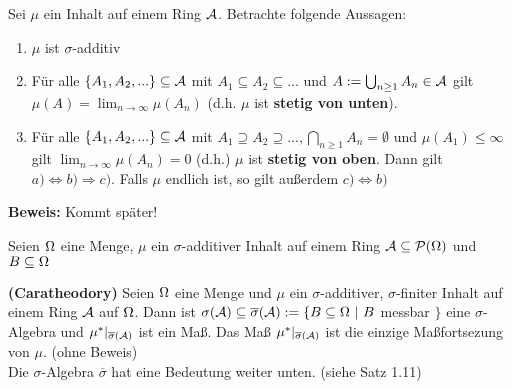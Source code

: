 \documentclass[parskip = full, 12pt]{scrartcl}
\begin{document}
\label{ss: Satz 1.7}
	Sei $\mu$ ein Inhalt auf einem Ring $\mathcal{A}$. Betrachte folgende Aussagen:
	\begin{enumerate}
		\item $\mu$ ist $\sigma$-additiv
		\item Für alle $\{A_1,A_2,...\} \subseteq \mathcal{A}$ mit $A_1 \subseteq A_2 
			\subseteq ...$ und $A := \bigcup_{n \geq 1} A_n \in \mathcal{A}$ gilt 
			$\mu(A) =\lim_{n \rightarrow \infty} \mu(A_n)$ (d.h. $\mu$ 
			ist \textbf{stetig von unten}). 
		\item Für alle $\{A_1,A_2,...\} \subseteq \mathcal{A}$ mit $A_1 \supseteq A_2 
			\supseteq ..., \bigcap_{n \geq 1} A_n = \emptyset$ und $\mu(A_1)
			\leq \infty$ gilt $\lim_{n \rightarrow \infty} \mu(A_n) = 0$ 
			(d.h.) $\mu$ ist \textbf{stetig von oben}. Dann gilt $a) \Leftrightarrow
			b) \Rightarrow c)$. Falls $\mu$ endlich ist, so gilt außerdem $c)
			\Leftrightarrow b)$
	\end{enumerate}
	\textbf{Beweis:} Kommt später!

\label{ss: Defintion 1.8}
	Seien $\Omega$ eine Menge, $\mu$ ein $\sigma$-additiver Inhalt auf einem Ring
	$\mathcal{A} \subseteq \mathcal{P}(\Omega)$ und $B \subseteq \Omega$

\label{ss: Satz 1.9}
	\textbf{(Caratheodory)} Seien $\Omega$ eine Menge und $\mu$ ein $\sigma$-additiver, 
	$\sigma$-finiter Inhalt auf einem Ring $\mathcal{A}$ auf $\Omega$. Dann ist $\sigma(\mathcal{A})
	\subseteq \overline{\sigma}(\mathcal{A}) := \{ B \subseteq \Omega\ |\ B $ messbar $\}$ 
	eine $\sigma$-Algebra und $\mu^*|_{\overline{\sigma}(\mathcal{A})}$ ist ein Maß. Das 
  Maß $\mu^*|_{\overline{\sigma}(\mathcal{A})}$ ist die einzige Maßfortsezung von $\mu$. 
	(ohne Beweis) \\
	Die $\sigma$-Algebra $\overline{\sigma}$ hat eine Bedeutung weiter unten.
	(siehe Satz 1.11)
\end{document}
